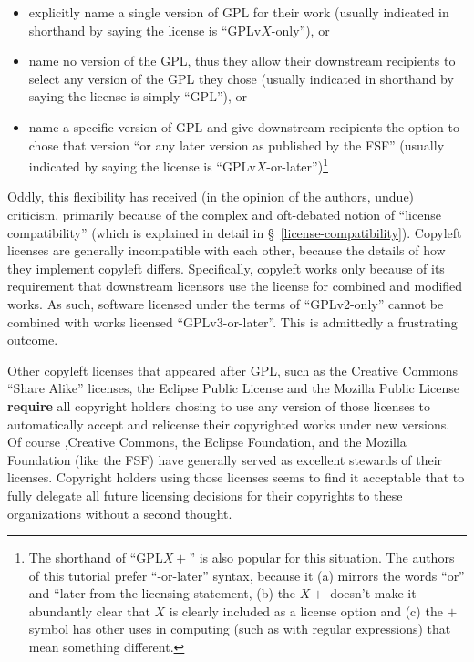 \begin{itemize}

\item explicitly name a single version of GPL for their work (usually
  indicated in shorthand by saying the license is ``GPLv$X$-only''), or

\item name no version of the GPL, thus they allow their downstream recipients
  to select any version of the GPL they chose (usually indicated in shorthand
  by saying the license is simply ``GPL''), or

\item name a specific version of GPL and give downstream recipients the
  option to chose that version ``or any later version as published by the
  FSF'' (usually indicated by saying the license is
  ``GPLv$X$-or-later'')\footnote{The shorthand of ``GPL$X+$'' is also popular
    for this situation.  The authors of this tutorial prefer ``-or-later''
    syntax, because it (a) mirrors the words ``or'' and ``later from the
    licensing statement, (b) the $X+$ doesn't make it abundantly clear that
    $X$ is clearly included as a license option and (c) the $+$ symbol has
    other uses in computing (such as with regular expressions) that mean
    something different.}
\end{itemize}

\label{license-compatibility-first-mentioned}

Oddly, this flexibility has received (in the opinion of the authors, undue)
criticism, primarily because of the complex and oft-debated notion of
``license compatibility'' (which is explained in detail in
\S~\ref{license-compatibility}).  Copyleft licenses are generally
incompatible with each other, because the details of how they implement
copyleft differs.  Specifically, copyleft works only because of its
requirement that downstream licensors use the  license for
combined and modified works.  As such, software licensed under the terms of
``GPLv2-only'' cannot be combined with works licensed ``GPLv3-or-later''.
This is admittedly a frustrating outcome.

Other copyleft licenses that appeared after GPL, such
as the Creative Commons ``Share Alike'' licenses, the Eclipse Public License
and the Mozilla Public License \textbf{require} all copyright holders chosing
to use any version of those licenses to automatically accept and relicense
their copyrighted works under new versions.  Of course ,Creative Commons, the
Eclipse Foundation, and the Mozilla Foundation (like the FSF) have generally
served as excellent stewards of their licenses.  Copyright holders using
those licenses seems to find it acceptable that to fully delegate all future
licensing decisions for their copyrights to these organizations without a
second thought.

